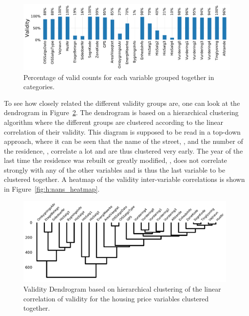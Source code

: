 
\begin{figure}
  \centerfloat
  \includegraphics[width=\textwidth, trim=0 0 0 0, clip]{figures/housing/missing_bar.pdf}
  \caption[Validity of Input Features]
          {Percentage of valid counts for each variable grouped together in categories.}
  \label{fig:h:nans}
\end{figure}

To see how closely related the different validity groups are, one can look at the dendrogram in Figure~\ref{fig:h:nans_dendrogram}. The dendrogram is based on a hierarchical clustering algorithm \citep{virtanenSciPyFundamentalAlgorithms2019} where the different groups are clustered according to the linear correlation of their validity. This diagram is supposed to be read in a top-down approach, where it can be seen that the name of the street, , and the number of the residence, , correlate a lot and are thus clustered very early. The year of the last time the residence was rebuilt or greatly modified, , does not correlate strongly with any of the other variables and is thus the last variable to be clustered together. A heatmap of the validity inter-variable correlations is shown in Figure~\ref{fig:h:nans_heatmap}. 

\begin{figure}
  \includegraphics[width=0.98\textwidth, trim=35 10 0 10, clip]{figures/housing/missing_dendrogram.pdf}
  \caption[Validity Dendrogram]
          {Validity Dendrogram based on hierarchical clustering of the linear correlation of validity for the housing price variables clustered together.}
  \label{fig:h:nans_dendrogram}
\end{figure}



